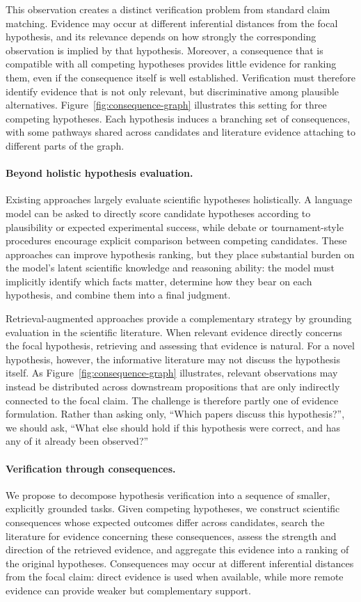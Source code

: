 \documentclass[twoside]{article}
\begin{document}
This observation creates a distinct verification problem from standard claim matching. Evidence may occur at different inferential distances from the focal hypothesis, and its relevance depends on how strongly the corresponding observation is implied by that hypothesis. Moreover, a consequence that is compatible with all competing hypotheses provides little evidence for ranking them, even if the consequence itself is well established. Verification must therefore identify evidence that is not only relevant, but discriminative among plausible alternatives. Figure~\ref{fig:consequence-graph} illustrates this setting for three competing hypotheses. Each hypothesis induces a branching set of consequences, with some pathways shared across candidates and literature evidence attaching to different parts of the graph.


\paragraph{Beyond holistic hypothesis evaluation.}
Existing approaches largely evaluate scientific hypotheses holistically. A
language model can be asked to directly score candidate hypotheses according to
plausibility or expected experimental success, while debate or tournament-style
procedures encourage explicit comparison between competing candidates. These
approaches can improve hypothesis ranking, but they place substantial burden on
the model's latent scientific knowledge and reasoning ability: the model must
implicitly identify which facts matter, determine how they bear on each
hypothesis, and combine them into a final judgment.

Retrieval-augmented approaches provide a complementary strategy by grounding evaluation in the scientific literature. When relevant evidence directly concerns the focal hypothesis, retrieving and assessing that evidence is natural. For a novel hypothesis, however, the informative literature may not discuss the hypothesis itself. As Figure~\ref{fig:consequence-graph} illustrates, relevant observations may instead be distributed across downstream propositions that are only indirectly connected to the focal claim. The challenge is therefore partly one of evidence formulation. Rather than asking only, ``Which papers discuss this hypothesis?'', we should ask, ``What else should hold if this hypothesis were correct, and has any of it already been observed?''

\paragraph{Verification through consequences.}
We propose to decompose hypothesis verification into a sequence of smaller,
explicitly grounded tasks. Given competing hypotheses, we construct scientific
consequences whose expected outcomes differ across candidates, search the
literature for evidence concerning these consequences, assess the strength and
direction of the retrieved evidence, and aggregate this evidence into a ranking
of the original hypotheses. Consequences may occur at different inferential
distances from the focal claim: direct evidence is used when available, while
more remote evidence can provide weaker but complementary support.
\end{document}
